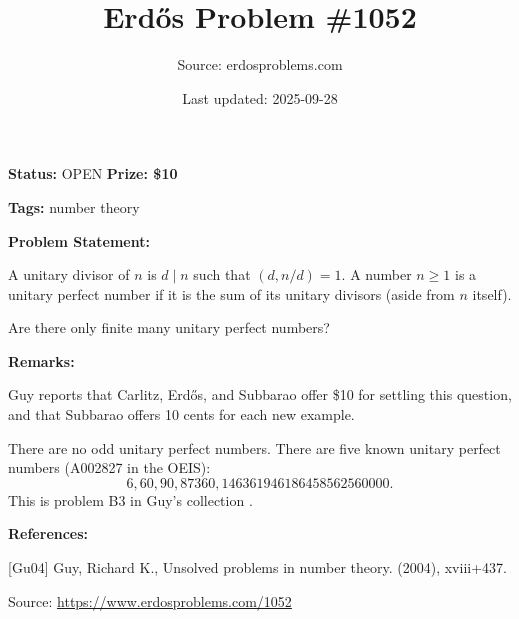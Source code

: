 \documentclass{article}
\title{Erd\H{o}s Problem \#1052}
\date{Last updated: 2025-09-28}
\author{Source: erdosproblems.com}
\begin{document}
\maketitle

\noindent\textbf{Status:} OPEN \quad \textbf{Prize: \$10}

\noindent\textbf{Tags:} number theory

\medskip
\noindent\textbf{Problem Statement:}

A unitary divisor of $n$ is $d\mid n$ such that $(d,n/d)=1$. A number $n\geq 1$ is a unitary perfect number if it is the sum of its unitary divisors (aside from $n$ itself).

Are there only finite many unitary perfect numbers?

\bigskip
\noindent\textbf{Remarks:}

Guy \cite{Gu04} reports that Carlitz, Erd\H{o}s, and Subbarao offer \$10 for settling this question, and that Subbarao offers 10 cents for each new example.

There are no odd unitary perfect numbers. There are five known unitary perfect numbers (A002827 in the OEIS):\[6, 60, 90, 87360, 146361946186458562560000.\]This is problem B3 in Guy's collection \cite{Gu04}.

\bigskip
\noindent\textbf{References:}

[Gu04] Guy, Richard K., Unsolved problems in number theory. (2004), xviii+437.

\bigskip
\noindent\small{Source: \url{https://www.erdosproblems.com/1052}}
\end{document}
